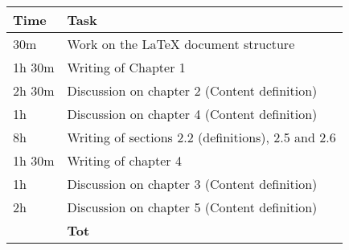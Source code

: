 \begin{center}
    {\renewcommand{\arraystretch}{2}%
    \begin{tabular}{L{2cm}L{12cm}}
        \hline
        \textbf{Time} & \textbf{Task} \\
        \hline
        30m & Work on the LaTeX document structure \\
        \hline
        1h 30m & Writing of Chapter 1 \\
        \hline
        2h 30m & Discussion on chapter 2 (Content definition) \\
        \hline
        1h & Discussion on chapter 4 (Content definition) \\
        \hline
        8h & Writing of sections 2.2 (definitions), 2.5 and 2.6 \\
        \hline
        1h 30m & Writing of chapter 4 \\
        \hline
        1h & Discussion on chapter 3 (Content definition) \\
        \hline
        2h & Discussion on chapter 5 (Content definition) \\
        \hline
        \textbf{} & \textbf{Tot} \\
    \end{tabular}}
\end{center}